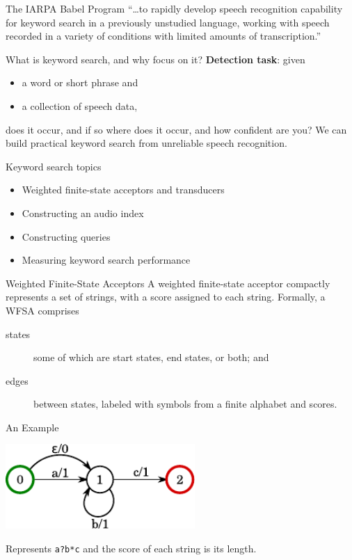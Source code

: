 \begin{frame}{The IARPA Babel Program}{}
  \Large{``\ldots to rapidly develop speech recognition
    capability for \alert{keyword search} in a previously unstudied
    language, working with speech recorded in a variety of
    conditions with limited amounts of transcription.''}\par
\end{frame}

\begin{frame}{What is keyword search, and why focus on it?}{}
  {\bf Detection task}: given
    \begin{itemize}
    \item a word or short phrase and
    \item a collection of speech data,
    \end{itemize}
    does it occur, and if so where does it occur, and how confident are you?
    \vfill
    We can build practical keyword search from
    \alert{unreliable} speech recognition.
\end{frame}

\begin{frame}{Keyword search topics}{}
  \begin{itemize}
  \item Weighted finite-state acceptors and transducers
  \item Constructing an audio index
  \item Constructing queries
  \item Measuring keyword search performance
  \end{itemize}
\end{frame}

\begin{frame}{Weighted Finite-State Acceptors}{}
  A \alert{weighted finite-state acceptor} compactly represents a set
  of strings, with a score assigned to each string.
  \vfill
  Formally, a WFSA comprises
  \begin{description}
  \item[states] some of which are start states, end states, or both;
    and
  \item[edges] between states, labeled with symbols from a finite
    alphabet and scores.
  \end{description}
\end{frame}

\begin{frame}{An Example}{}
  \begin{center}
    \includegraphics[width=72mm]{figures/WFSA}
  \end{center}
  \vfill
  Represents {\tt a?b*c} and the score of each string is its length.
\end{frame}

